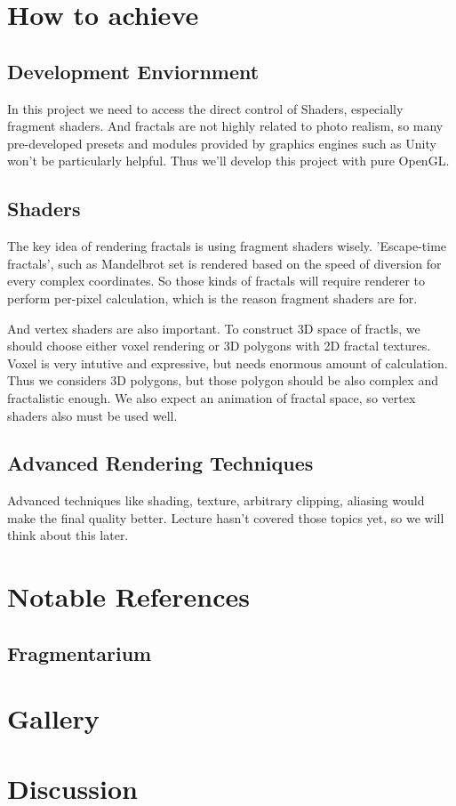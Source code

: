 \documentclass[a4paper]{article}
\begin{document}
\section{How to achieve}
\subsection{Development Enviornment}
In this project we need to access the direct control of Shaders, especially fragment shaders.
And fractals are not highly related to photo realism, so many pre-developed presets and modules provided by
graphics engines such as Unity won't be particularly helpful.
Thus we'll develop this project with pure OpenGL.
\subsection{Shaders}
The key idea of rendering fractals is using fragment shaders wisely.
'Escape-time fractals', such as Mandelbrot set is rendered based on the speed of diversion for every complex coordinates.
So those kinds of fractals will require renderer to perform per-pixel calculation, which is the reason fragment shaders are for.

And vertex shaders are also important.
To construct 3D space of fractls, we should choose either voxel rendering or 3D polygons with 2D fractal textures.
Voxel is very intutive and expressive, but needs enormous amount of calculation.
Thus we considers 3D polygons, but those polygon should be also complex and fractalistic enough.
We also expect an animation of fractal space, so vertex shaders also must be used well.
\subsection{Advanced Rendering Techniques}
Advanced techniques like shading, texture, arbitrary clipping, aliasing would make the final quality better.
Lecture hasn't covered those topics yet, so we will think about this later.
\section{Notable References}
\subsection{Fragmentarium}
\section{Gallery}
\begin{figure}
\centering
{}
\end{figure}
\section{Discussion}
\end{document}
